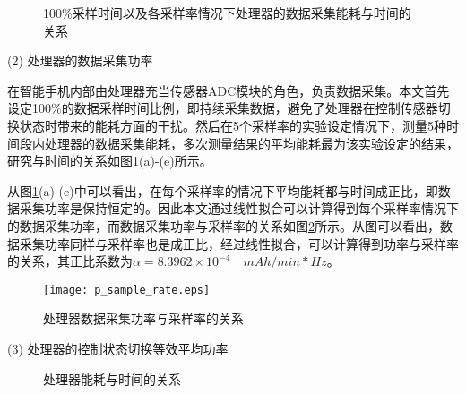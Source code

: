 \begin{figure}[!htb]
    \centering
    \caption{100\%采样时间以及各采样率情况下处理器的数据采集能耗与时间的关系}\label{sample}
\end{figure}


	(2) 处理器的数据采集功率

\par 在智能手机内部由处理器充当传感器ADC模块的角色，负责数据采集。本文首先设定100\%的数据采样时间比例，即持续采集数据，避免了处理器在控制传感器切换状态时带来的能耗方面的干扰。然后在5个采样率的实验设定情况下，测量5种时间段内处理器的数据采集能耗，多次测量结果的平均能耗最为该实验设定的结果，研究与时间的关系如图\ref{sample}(a)-(e)所示。


\par 从图\ref{sample}(a)-(e)中可以看出，在每个采样率的情况下平均能耗都与时间成正比，即数据采集功率是保持恒定的。因此本文通过线性拟合可以计算得到每个采样率情况下的数据采集功率，而数据采集功率与采样率的关系如图\ref{p_sample_rate}所示。从图可以看出，数据采集功率同样与采样率也是成正比，经过线性拟合，可以计算得到功率与采样率的关系，其正比系数为$\alpha = 8.3962 \times 10^{-4} \quad mAh/min*Hz$。

\begin{figure}[!htb]
\centering
\texttt{[image: p\_sample\_rate.eps]}
\caption{处理器数据采集功率与采样率的关系}\label{p_sample_rate}
\end{figure}



	(3) 处理器的控制状态切换等效平均功率


\begin{figure}[!htb]
    \centering
    \caption{处理器能耗与时间的关系}\label{on-off}
\end{figure}

